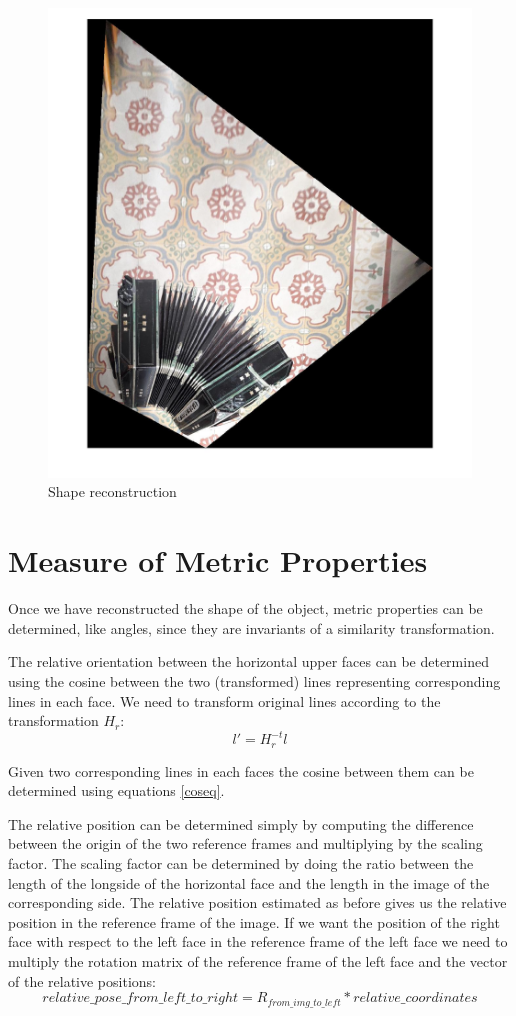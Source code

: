 \documentclass[11pt, oneside]{article}   	%
\begin{document}
\begin{figure}
\includegraphics[width=0.8\linewidth]{shape_rec_rotated.jpg}
\caption{Shape reconstruction}
\label{shaperec}
\end{figure}

\section {Measure of Metric Properties} \label{metricprop}
Once we have reconstructed the shape of the object, metric properties can be determined, like angles, since they are invariants of a similarity transformation.

The relative orientation between the horizontal upper faces can be determined using the cosine between the two (transformed) lines representing corresponding lines in each face. We need to transform original lines according to the transformation $H_r$:
$$
l' = H_r^{-t}l
$$

Given two corresponding lines in each faces the cosine between them can be determined using equations \ref{coseq}.

The relative position can be determined simply by computing the difference between the origin of the two reference frames and multiplying by the scaling factor.
The scaling factor can be determined by doing the ratio between the length of the longside of the horizontal face and the length in the image of the corresponding side.
The relative position estimated as before gives us the relative position in the reference frame of the image. If we want the position of the right face with respect to the left face in the reference frame of the left face we need to multiply the rotation matrix of the reference frame of the left face and the vector of the relative positions:
$$
relative\_pose\_from\_left\_to\_right = R_{from\_img\_to\_left} * relative\_coordinates
$$
\end{document}
